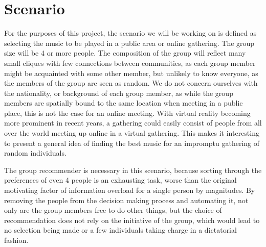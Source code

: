 \section{Scenario}\label{sec:introduction_scenario}

For the purposes of this project, the scenario we will be working on is defined as selecting the music to be played in a public area or online gathering. The group size will be 4 or more people. The composition of the group will reflect many small cliques with few connections between communities, as each group member might be acquainted with some other member, but unlikely to know everyone, as the members of the group are seen as random. We do not concern ourselves with the nationality, or background of each group member, as while the group members are spatially bound to the same location when meeting in a public place, this is not the case for an online meeting. With virtual reality becoming more prominent in recent years, a gathering could easily consist of people from all over the world meeting up online in a virtual gathering. This makes it interesting to present a general idea of finding the best music for an impromptu gathering of random individuals. %

The group recommender is necessary in this scenario, because sorting through the preferences of even 4 people is an exhausting task, worse than the original motivating factor of information overload for a single person by magnitudes. By removing the people from the decision making process and automating it, not only are the group members free to do other things, but the choice of recommendation does not rely on the initiative of the group, which would lead to no selection being made or a few individuals taking charge in a dictatorial fashion.

